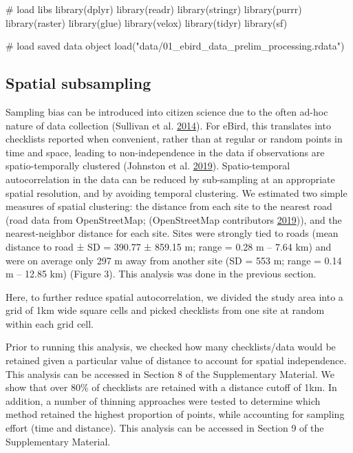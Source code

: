 \documentclass[]{article}
\newenvironment{Shaded}{}{}
\newcommand{\CommentTok}[1]{\textcolor[rgb]{0.00,0.50,0.00}{#1}}
\newcommand{\KeywordTok}[1]{\textcolor[rgb]{0.00,0.00,1.00}{#1}}
\newcommand{\NormalTok}[1]{#1}
\newcommand{\StringTok}[1]{\textcolor[rgb]{0.00,0.50,0.50}{#1}}
\begin{document}
\begin{Shaded}
\begin{Highlighting}[numbers=left,,]

\CommentTok{# load libs}
\KeywordTok{library}\NormalTok{(dplyr)}
\KeywordTok{library}\NormalTok{(readr)}
\KeywordTok{library}\NormalTok{(stringr)}
\KeywordTok{library}\NormalTok{(purrr)}
\KeywordTok{library}\NormalTok{(raster)}
\KeywordTok{library}\NormalTok{(glue)}
\KeywordTok{library}\NormalTok{(velox)}
\KeywordTok{library}\NormalTok{(tidyr)}
\KeywordTok{library}\NormalTok{(sf)}

\CommentTok{# load saved data object}
\KeywordTok{load}\NormalTok{(}\StringTok{"data/01_ebird_data_prelim_processing.rdata"}\NormalTok{)}
\end{Highlighting}
\end{Shaded}

\hypertarget{spatial-subsampling}{%
\subsection{Spatial subsampling}\label{spatial-subsampling}}

Sampling bias can be introduced into citizen science due to the often ad-hoc nature of data collection (Sullivan et al. \protect\hyperlink{ref-sullivan2014}{2014}). For eBird, this translates into checklists reported when convenient, rather than at regular or random points in time and space, leading to non-independence in the data if observations are spatio-temporally clustered (Johnston et al. \protect\hyperlink{ref-johnston2019a}{2019}). Spatio-temporal autocorrelation in the data can be reduced by sub-sampling at an appropriate spatial resolution, and by avoiding temporal clustering. We estimated two simple measures of spatial clustering: the distance from each site to the nearest road (road data from OpenStreetMap; (OpenStreetMap contributors \protect\hyperlink{ref-OpenStreetMap}{2019})), and the nearest-neighbor distance for each site. Sites were strongly tied to roads (mean distance to road ± SD = 390.77 ± 859.15 m; range = 0.28 m -- 7.64 km) and were on average only 297 m away from another site (SD = 553 m; range = 0.14 m -- 12.85 km) (Figure 3). This analysis was done in the previous section.

Here, to further reduce spatial autocorrelation, we divided the study area into a grid of 1km wide square cells and picked checklists from one site at random within each grid cell.

Prior to running this analysis, we checked how many checklists/data would be retained given a particular value of distance to account for spatial independence. This analysis can be accessed in Section 8 of the Supplementary Material. We show that over 80\% of checklists are retained with a distance cutoff of 1km. In addition, a number of thinning approaches were tested to determine which method retained the highest proportion of points, while accounting for sampling effort (time and distance). This analysis can be accessed in Section 9 of the Supplementary Material.
\end{document}
